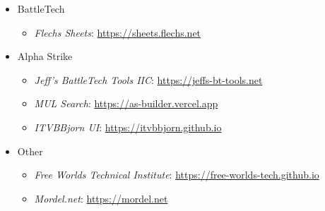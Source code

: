 \begin{itemize}

  \item BattleTech

  \begin{itemize}

    \item \emph{Flechs Sheets}: \href{https://sheets.flechs.net}{https://sheets.flechs.net}

  \end{itemize}

  \item Alpha Strike

  \begin{itemize}

    \item \emph{Jeff's BattleTech Tools IIC}: \href{https://jeffs-bt-tools.net}{https://jeffs-bt-tools.net}

    \item \emph{MUL Search}: \href{https://as-builder.vercel.app}{https://as-builder.vercel.app}

    \item \emph{ITVBBjorn UI}: \href{https://itvbbjorn.github.io}{https://itvbbjorn.github.io}

  \end{itemize}

  \item Other

  \begin{itemize}

    \item \emph{Free Worlds Technical Institute}: \href{https://free-worlds-tech.github.io}{https://free-worlds-tech.github.io}

    \item \emph{Mordel.net}: \href{https://mordel.net}{https://mordel.net}

  \end{itemize}

\end{itemize}
